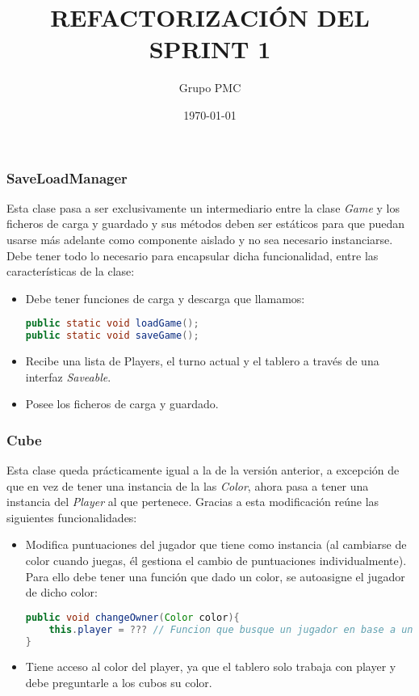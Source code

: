 \documentclass{article}
\title{REFACTORIZACIÓN DEL SPRINT 1}
\date{\today}
\author{Grupo PMC}
\begin{document}
\maketitle

\subsubsection*{SaveLoadManager}
Esta clase pasa a ser exclusivamente un intermediario entre la clase \textit{Game} y los ficheros de carga y guardado y sus métodos deben ser estáticos para que puedan usarse más adelante como componente aislado y no sea necesario instanciarse. Debe tener todo lo necesario para encapsular dicha funcionalidad, entre las características de la clase:
\begin{itemize}
\item Debe tener funciones de carga y descarga que llamamos:
\begin{lstlisting}[language=Java]
public static void loadGame();
public static void saveGame();
\end{lstlisting}
\item Recibe una lista de Players, el turno actual y el tablero a través de una interfaz \textit{Saveable}.
\item Posee los ficheros de carga y guardado.
\end{itemize}

\subsubsection*{Cube}
Esta clase queda prácticamente igual a la de la versión anterior, a excepción de que en vez de tener una instancia de la las \textit{Color}, ahora pasa a tener una instancia del \textit{Player} al que pertenece.
Gracias a esta modificación reúne las siguientes funcionalidades:
\begin{itemize}
\item Modifica puntuaciones del jugador que tiene como instancia (al cambiarse de color cuando juegas, él gestiona el cambio de puntuaciones individualmente). Para ello debe tener una función que dado un color, se autoasigne el jugador de dicho color:
\begin{lstlisting}[language=Java]
public void changeOwner(Color color){
	this.player = ??? // Funcion que busque un jugador en base a un player
}

\end{lstlisting}
\item Tiene acceso al color del player, ya que el tablero solo trabaja con player y debe preguntarle a los cubos su color.
\end{itemize}
\end{document}
